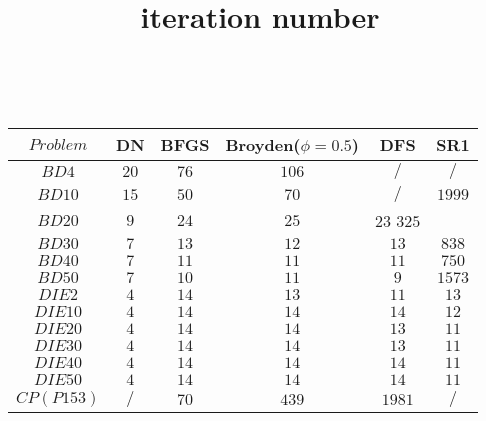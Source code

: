 \documentclass{article}
\begin{document}
\begin{table}[h!]
\title{ iteration number }
\\
	\centering
	\begin{tabular}{|c||c|c|c|c|c|}
		\hline
		 $Problem$ & DN & BFGS & Broyden($\phi=0.5$) & DFS & SR1 \\ \hline
		  
		 $BD4$ & $20$ & $76$ & $106$ & $/$ & $/$ \\ \hline
		 
		 $BD10$ & $15$ & $50$ & $70$ & $/$ & $1999$ \\ \hline
		 
		 $BD20$ & $9$ & $24$ & $25$ & $23$  $325$ \\ \hline
		 
		 $BD30$ & $7$ & $13$ & $12$ & $13$ & $838$ \\ \hline
		 
		 $BD40$ & $7$ & $11$ & $11$ & $11$ & $750$ \\ \hline
		  
		 $BD50$ & $7$ & $10$ & $11$ & $9$ & $1573$ \\ \hline
		 
		 $DIE2$ & $4$ & $14$ & $13$ & $11$ & $13$ \\ \hline
		 
		 $DIE10$ & $4$ & $14$ & $14$ & $14$ & $12$ \\ \hline
		 
		 $DIE20$ & $4$ & $14$ & $14$ & $13$ & $11$ \\ \hline
		 
		 $DIE30$ & $4$ & $14$ & $14$ & $13$ & $11$ \\ \hline
		 
		 $DIE40$ & $4$ & $14$ & $14$ & $14$ & $11$ \\ \hline
		  
		 $DIE50$ & $4$ & $14$ & $14$ & $14$ & $11$ \\ \hline
		 
		 $CP(P153)$ & $/$ & $70$ & $439$ & $1981$ & $/$ \\ \hline
		
	\end{tabular}

\end{table}
\end{document}
